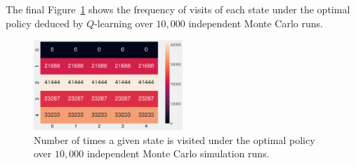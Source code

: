 The final Figure~\ref{fig:visit_count} shows the frequency of visits of each
state under the optimal policy deduced by $Q$-learning over $10,000$ independent
Monte Carlo runs.
%
\begin{figure}[bth]
    \centering
    \includegraphics[width=0.5\textwidth]{./figures/visit_count.eps}
    \caption{Number of times a given state is visited under the optimal policy over $10,000$ independent Monte Carlo simulation runs.}
    \label{fig:visit_count}
\end{figure}